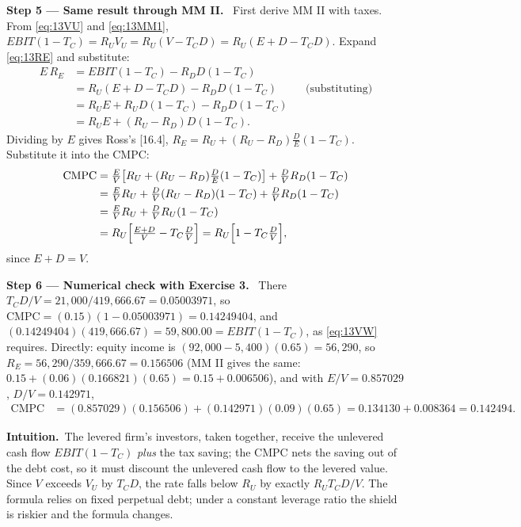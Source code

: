 \documentclass[11pt,a4paper]{article}
\numberwithin{equation}{section}
\newcommand{\step}[2]{\par\smallskip\noindent\textbf{Step #1 --- #2.}~}
\newcommand{\intuition}{\par\smallskip\noindent\textbf{Intuition.}~}
\begin{document}
\step{5}{Same result through MM II} First derive MM II with taxes. From \eqref{eq:13VU} and
\eqref{eq:13MM1}, $\mathit{EBIT}(1-T_C)=R_UV_U=R_U(V-T_CD)=R_U(E+D-T_CD)$. Expand \eqref{eq:13RE}
and substitute:
\begin{align}
  E\,R_E &= \mathit{EBIT}(1-T_C)-R_DD(1-T_C) \nonumber\\
     &= R_U(E+D-T_CD)-R_DD(1-T_C) && \text{(substituting)} \nonumber\\
     &= R_UE+R_UD(1-T_C)-R_DD(1-T_C) \nonumber\\
     &= R_UE+(R_U-R_D)D(1-T_C). \nonumber
\end{align}
Dividing by $E$ gives Ross's [16.4], $R_E=R_U+(R_U-R_D)\tfrac{D}{E}(1-T_C)$. Substitute it into
the CMPC:
\begin{align}
  \text{CMPC} &= \tfrac{E}{V}\bigl[R_U+(R_U-R_D)\tfrac{D}{E}(1-T_C)\bigr]+\tfrac{D}{V}R_D(1-T_C) \nonumber\\
     &= \tfrac{E}{V}R_U+\tfrac{D}{V}(R_U-R_D)(1-T_C)+\tfrac{D}{V}R_D(1-T_C) \nonumber\\
     &= \tfrac{E}{V}R_U+\tfrac{D}{V}R_U(1-T_C) \nonumber\\
     &= R_U\Bigl[\tfrac{E+D}{V}-T_C\tfrac{D}{V}\Bigr] = R_U\Bigl[1-T_C\tfrac{D}{V}\Bigr], \nonumber
\end{align}
since $E+D=V$.

\step{6}{Numerical check with Exercise 3} There $T_CD/V=21{,}000/419{,}666.67=0.05003971$, so
$\text{CMPC}=(0.15)(1-0.05003971)=0.14249404$, and $(0.14249404)(419{,}666.67)=59{,}800.00=\mathit{EBIT}(1-T_C)$,
as \eqref{eq:13VW} requires. Directly: equity income is $(92{,}000-5{,}400)(0.65)=56{,}290$, so
$R_E=56{,}290/359{,}666.67=0.156506$ (MM II gives the same:
$0.15+(0.06)(0.166821)(0.65)=0.15+0.006506$), and with $E/V=0.857029$, $D/V=0.142971$,
\begin{align}
  \text{CMPC} &= (0.857029)(0.156506)+(0.142971)(0.09)(0.65) = 0.134130+0.008364 = 0.142494. \nonumber
\end{align}

\intuition The levered firm's investors, taken together, receive the unlevered cash flow
$\mathit{EBIT}(1-T_C)$ \emph{plus} the tax saving; the CMPC nets the saving out of the debt cost,
so it must discount the unlevered cash flow to the levered value. Since $V$ exceeds $V_U$ by
$T_CD$, the rate falls below $R_U$ by exactly $R_U T_C D/V$. The formula relies on fixed
perpetual debt; under a constant leverage ratio the shield is riskier and the formula changes.
\end{document}
